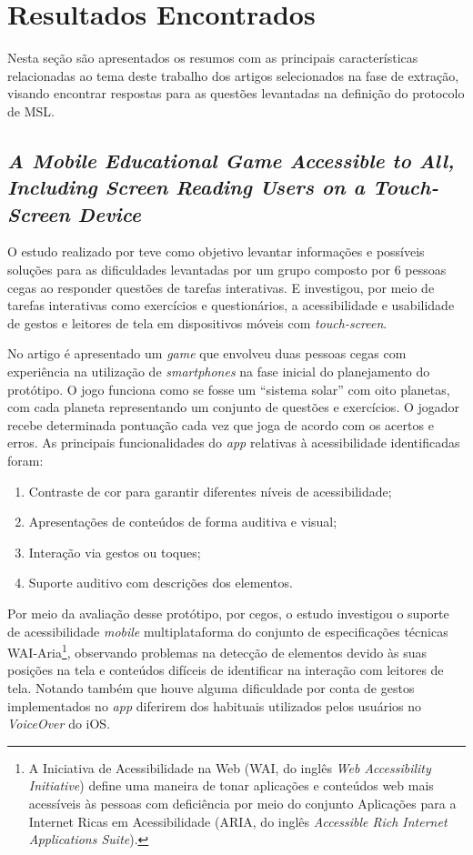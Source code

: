 \newpage{}

\section{Resultados Encontrados}

Nesta seção são apresentados os resumos com as principais características relacionadas ao tema deste trabalho dos artigos selecionados na fase de extração,
visando encontrar respostas para as questões levantadas na definição do protocolo de MSL\@.

\subsection{\emph{A Mobile Educational Game Accessible to All, Including Screen Reading Users on a Touch-Screen Device}}

O estudo realizado por  teve como objetivo levantar informações e possíveis soluções para as dificuldades levantadas por um grupo composto por 6 pessoas cegas ao responder questões de tarefas interativas.
E investigou, por meio de tarefas interativas como exercícios e questionários, a acessibilidade e usabilidade de gestos e leitores de tela em dispositivos móveis com \emph{touch-screen}.

No artigo é apresentado um \emph{game} que envolveu duas pessoas cegas com experiência na utilização de \emph{smartphones} na fase inicial do planejamento do protótipo.
O jogo funciona como se fosse um ``sistema solar'' com oito planetas, com cada planeta representando um conjunto de questões e exercícios.
O jogador recebe determinada pontuação cada vez que joga de acordo com os acertos e erros.
As principais funcionalidades do \emph{app} relativas à acessibilidade identificadas foram:

\begin{enumerate}
  \item Contraste de cor para garantir diferentes níveis de acessibilidade;
  \item Apresentações de conteúdos de forma auditiva e visual;
  \item Interação via gestos ou toques;
  \item Suporte auditivo com descrições dos elementos.
\end{enumerate}

Por meio da avaliação desse protótipo, por cegos, o estudo investigou o suporte de acessibilidade \emph{mobile} multiplataforma do conjunto de especificações
técnicas WAI-Aria\footnote{A Iniciativa de Acessibilidade na Web (WAI, do inglês \emph{Web Accessibility Initiative})
  define uma maneira de tonar aplicações e conteúdos web mais acessíveis às pessoas com deficiência por meio do conjunto
  Aplicações para a Internet Ricas em Acessibilidade (ARIA, do inglês \emph{Accessible Rich Internet Applications Suite}).},
observando problemas na detecção de elementos devido às suas posições na tela e conteúdos difíceis
de identificar na interação com leitores de tela. Notando também que houve alguma dificuldade por
conta de gestos implementados no \emph{app} diferirem dos habituais utilizados pelos usuários no \emph{VoiceOver} do iOS.

